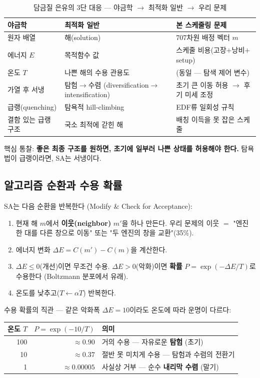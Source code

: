 \documentclass[11pt]{article}
\begin{document}
\begin{table}[H]
\centering
\caption{담금질 은유의 3단 대응 — 야금학 $\to$ 최적화 일반 $\to$ 우리 문제}
\label{tab:analogy}
\begin{tabular}{lll}
\toprule
야금학 & 최적화 일반 & 본 스케줄링 문제 \\
\midrule
원자 배열 & 해(solution) & 707차원 배정 벡터 $m$ \\
에너지 $E$ & 목적함수 값 & 스케줄 비용(고장$+$낭비$+$setup) \\
온도 $T$ & 나쁜 해의 수용 관용도 & (동일 — 탐색 제어 변수) \\
가열 후 서냉 & 탐험$\to$수렴 (diversification$\to$intensification) & 초기 큰 이동 허용 $\to$ 후기 미세 조정 \\
급랭(quenching) & 탐욕적 hill-climbing & EDF류 일회성 규칙 \\
결함 있는 급랭 구조 & 국소 최적에 갇힌 해 & 배칭 이득을 못 잡은 스케줄 \\
\bottomrule
\end{tabular}
\end{table}

핵심 통찰: \textbf{좋은 최종 구조를 원하면, 초기에 일부러 나쁜 상태를 허용해야 한다.}
탐욕법이 급랭이라면, SA는 서냉이다.

\subsection{알고리즘 순환과 수용 확률}

SA는 다음 순환을 반복한다 (Modify \& Check for Acceptance):

\begin{enumerate}[nosep]
  \item 현재 해 $m$에서 \textbf{이웃(neighbor)} $m'$을 하나 만든다.
        우리 문제의 이웃 $=$ "엔진 한 대를 다른 창으로 이동" 또는 "두 엔진의 창을 교환"(35\%).
  \item 에너지 변화 $\Delta E = C(m') - C(m)$을 계산한다.
  \item $\Delta E \le 0$(개선)이면 무조건 수용. $\Delta E > 0$(악화)이면 \textbf{확률}
        $P = \exp(-\Delta E / T)$로 수용한다 (Boltzmann 분포에서 유래).
  \item 온도를 낮추고($T \leftarrow \alpha T$) 반복한다.
\end{enumerate}

수용 확률의 직관 — 같은 악화폭 $\Delta E{=}10$이라도 온도에 따라 운명이 다르다:

\begin{center}
\begin{tabular}{rrl}
\toprule
온도 $T$ & $P=\exp(-10/T)$ & 의미 \\
\midrule
100 & $\approx 0.90$ & 거의 수용 — 자유로운 \textbf{탐험} (초기) \\
10 & $\approx 0.37$ & 절반 못 미치게 수용 — 탐험과 수렴의 전환기 \\
1 & $\approx 0.00005$ & 사실상 거부 — 순수 \textbf{내리막 수렴} (말기) \\
\bottomrule
\end{tabular}
\end{center}
\end{document}
